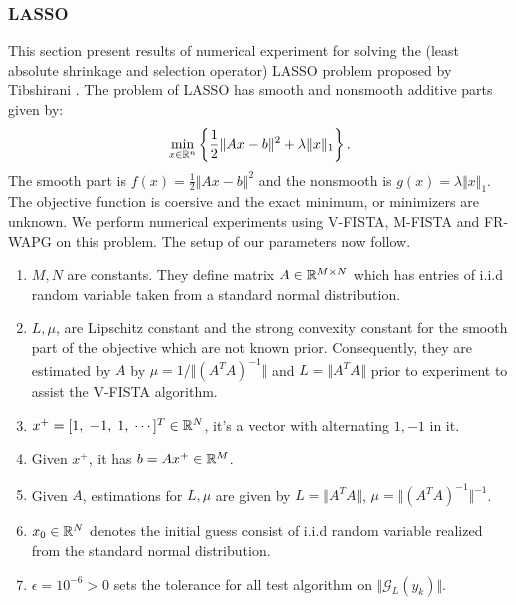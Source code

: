 \documentclass[12pt]{article}
\begin{document}
        \subsubsection{LASSO}
            This section present results of numerical experiment for solving the (least absolute shrinkage and selection operator) LASSO problem proposed by Tibshirani \cite{tibshirani_regression_1996}.
            The problem of LASSO has smooth and nonsmooth additive parts given by:
            \begin{align*}
                \min_{x \in \mathbb R^n}
                \left\lbrace
                    \frac{1}{2}\Vert Ax - b\Vert^2 + \lambda\Vert x\Vert_1
                \right\rbrace.
            \end{align*}
            The smooth part is $f(x) =\frac{1}{2}\Vert Ax - b\Vert^2$ and the nonsmooth is $g(x) = \lambda\Vert x\Vert_1$.
            The objective function is coersive and the exact minimum, or minimizers are unknown.
            We perform numerical experiments using V-FISTA, M-FISTA and FR-WAPG on this problem.
            The setup of our parameters now follow.
            \begin{enumerate}
                \item $M, N$ are constants. They define matrix $A \in \mathbb R^{M\times N}$ which has entries of i.i.d random variable taken from a standard normal distribution.
                \item $L, \mu$, are Lipschitz constant and the strong convexity constant for the smooth part of the objective which are not known prior. Consequently, they are estimated by $A$ by $\mu = 1/\Vert (A^TA)^{-1}\Vert$ and $L = \Vert A^TA\Vert$ prior to experiment to assist the V-FISTA algorithm.
                \item $x^+ = [1,\; -1,\; 1, \; \cdots ]^T \in \mathbb R^N$, it's a vector with alternating $1, -1$ in it.
                \item Given $x^+$, it has $b = Ax^+ \in \mathbb R^M$.
                \item Given $A$, estimations for $L,\mu$ are given by $L = \Vert A^TA\Vert$, $\mu = \Vert (A^TA)^{-1}\Vert^{-1}$.
                \item $x_0\in \mathbb R^N$ denotes the initial guess consist of i.i.d random variable realized from the standard normal distribution.
                \item $\epsilon = 10^{-6} > 0$ sets the tolerance for all test algorithm on $\Vert \mathcal G_L(y_k)\Vert$.
            \end{enumerate}
\end{document}
